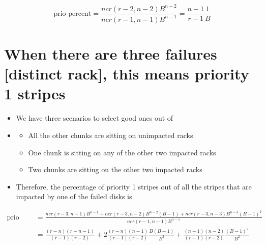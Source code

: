 \documentclass[journal]{IEEEtran}
\begin{document}
\begin{equation*}
  \text{prio percent}=\frac{ncr(r-2,n-2)B^{n-2}}{ncr(r-1,n-1)B^{n-1}}=\frac{n-1}{r-1}\frac{1}{B}
\end{equation*}

\section{When there are three failures [distinct rack], this means \textbf{priority 1 stripes}}
\begin{itemize}
  \item We have three scenarios to select good ones out of
  \item \begin{itemize}
    \item All the other chunks are sitting on unimpacted racks
    \item One chunk is sitting on any of the other two impacted racks
    \item Two chunks are sitting on the other two impacted racks
  \end{itemize}
  \item Therefore, the percentage of priority 1 stripes out of all the stripes that are impacted by one of the failed disks is
\end{itemize}

\begin{equation*}
  \begin{split}
    \text{prio percent} 
    & =\frac{ncr(r-3,n-1)B^{n-1}+ncr(r-3,n-2)B^{n-2}(B-1)+ncr(r-3,n-3)B^{n-3}(B-1)^2}{ncr(r-1,n-1)B^{n-1}} \\
    & =\frac{(r-n)(r-n-1)}{(r-1)(r-2)}+2\frac{(r-n)(n-1)}{(r-1)(r-2)}\frac{B(B-1)}{B^2}+\frac{(n-1)(n-2)}{(r-1)(r-2)}\frac{(B-1)^2}{B^2}
  \end{split}
\end{equation*}
\end{document}
